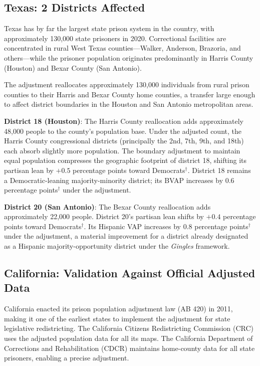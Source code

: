 \subsection{Texas: 2 Districts Affected}

Texas has by far the largest state prison system in the country,
with approximately 130,000 state prisoners in 2020. Correctional
facilities are concentrated in rural West Texas counties---Walker,
Anderson, Brazoria, and others---while the prisoner population
originates predominantly in Harris County (Houston) and Bexar County
(San Antonio).

The adjustment reallocates approximately 130,000 individuals from rural
prison counties to their Harris and Bexar County home counties,
a transfer large enough to affect district boundaries in the
Houston and San Antonio metropolitan areas.

\textbf{District 18 (Houston)}: The Harris County reallocation adds
approximately 48,000 people to the county's population base.
Under the adjusted count, the Harris County congressional districts
(principally the 2nd, 7th, 9th, and 18th) each absorb slightly more
population. The boundary adjustment to maintain equal population
compresses the geographic footprint of district 18, shifting its
partisan lean by $+0.5$ percentage points toward Democrats$^\dagger$.
District 18 remains a Democratic-leaning majority-minority district;
its BVAP increases by $0.6$ percentage points$^\dagger$ under the adjustment.

\textbf{District 20 (San Antonio)}: The Bexar County reallocation adds
approximately 22,000 people. District 20's partisan lean shifts by
$+0.4$ percentage points toward Democrats$^\dagger$. Its Hispanic VAP
increases by $0.8$ percentage points$^\dagger$ under the adjustment,
a material improvement for a district already designated as a Hispanic
majority-opportunity district under the \textit{Gingles} framework.

\subsection{California: Validation Against Official Adjusted Data}

California enacted its prison population adjustment law (AB 420) in 2011,
making it one of the earliest states to implement the adjustment for
state legislative redistricting. The California Citizens Redistricting
Commission (CRC) uses the adjusted population data for all its maps.
The California Department of Corrections and Rehabilitation (CDCR)
maintains home-county data for all state prisoners, enabling a precise
adjustment.

